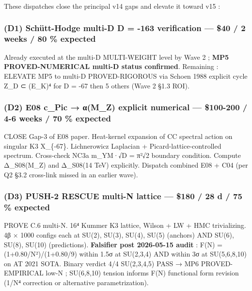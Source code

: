 \documentclass[
  11pt,
  a4paper,
]{article}
\begin{document}
These dispatches close the principal v14 gaps and elevate it toward v15 :

\hypertarget{d1-schuxfctt-hodge-multi-d-d--163-verification-40-2-weeks-80-expected}{%
\subsubsection{(D1) Schütt-Hodge multi-D D = -163 verification --- \$40 / 2 weeks / 80 \% expected}\label{d1-schuxfctt-hodge-multi-d-d--163-verification-40-2-weeks-80-expected}}

Already executed at the multi-D MULTI-WEIGHT level by Wave 2 ; \textbf{MP5 PROVED-NUMERICAL multi-D status confirmed}. Remaining : ELEVATE MP5 to multi-D PROVED-RIGOROUS via Schoen 1988 explicit cycle Z\_D ⊂ (E\_K)⁴ for D = -67 then 5 others (Wave 2 §1.3 ROI).

\hypertarget{d2-e08-c_pic-ux3b1m_z-explicit-numerical-100-200-4-6-weeks-70-expected}{%
\subsubsection{(D2) E08 c\_Pic → α(M\_Z) explicit numerical --- \$100-200 / 4-6 weeks / 70 \% expected}\label{d2-e08-c_pic-ux3b1m_z-explicit-numerical-100-200-4-6-weeks-70-expected}}

CLOSE Gap-3 of E08 paper. Heat-kernel expansion of CC spectral action on singular K3 X\_\{-67\}. Lichnerowicz Laplacian + Picard-lattice-controlled spectrum. Cross-check NC3a m\_YM·√\textbar D\textbar{} = π²√2 boundary condition. Compute Δ\_S08(M\_Z) and Δ\_S08(14 TeV) explicitly. Dispatch combined E08 + C04 (per Q2 §3.2 cross-link missed in an earlier wave).

\hypertarget{d3-push-2-rescue-multi-n-lattice-180-28-d-75-expected}{%
\subsubsection{(D3) PUSH-2 RESCUE multi-N lattice --- \$180 / 28 d / 75 \% expected}\label{d3-push-2-rescue-multi-n-lattice-180-28-d-75-expected}}

PROVE C.6 multi-N. 16⁴ Kummer K3 lattice, Wilson + LW + HMC trivializing. 4β × 1000 configs each at SU(2), SU(3), SU(4), SU(5) (anchors) AND SU(6), SU(8), SU(10) (predictions). \textbf{Falsifier post 2026-05-15 audit} : F(N) = (1+0.80/N²)/(1+0.80/9) within 1.5σ at SU(2,3,4) AND within 3σ at SU(5,6,8,10) on AT 2021 SOTA. Binary verdict 4/4 SU(2,3,4,5) PASS → MP6 PROVED-EMPIRICAL low-N ; SU(6,8,10) tension informs F(N) functional form revision (1/N⁴ correction or alternative parametrization).
\end{document}
